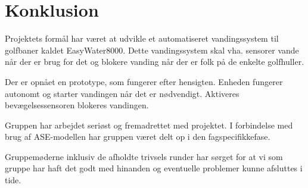 
\chapter{Konklusion}

Projektets formål har været at udvikle et automatiseret vandingssystem til golfbaner kaldet EasyWater8000. Dette vandingssystem skal vha. sensorer vande når der er brug for det og blokere vanding når der er folk på de enkelte golfhuller. 

Der er opnået en prototype, som fungerer efter hensigten. Enheden fungerer autonomt og starter vandingen når det er nødvendigt. Aktiveres bevægelsessensoren blokeres vandingen.  

Gruppen har arbejdet seriøst og fremadrettet med projektet. I forbindelse med brug af ASE-modellen har gruppen været delt op i den fagspecifikkefase. 

Gruppemøderne inklusiv de afholdte trivsels runder har sørget for at vi som gruppe har haft det godt med hinanden og eventuelle problemer kunne afsluttes i tide. 


